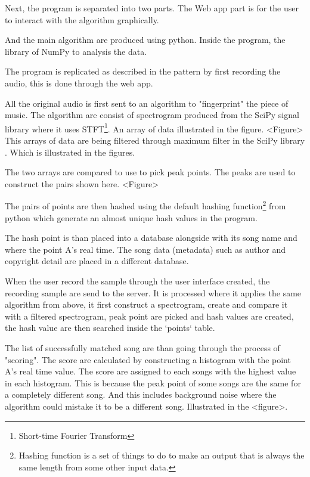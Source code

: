 Next, the program is separated into two parts. The Web app part is for the user to interact with the algorithm graphically. 

And the main algorithm are produced using python. Inside the program, the library of NumPy\cite{harris_array_2020} to analysis the data.

The program is replicated as described in the pattern by first recording the audio, this is done through the web app. 

All the original audio is first sent to an algorithm to "fingerprint" the piece of music. The algorithm are consist of spectrogram produced from the SciPy signal library where it uses STFT\footnote{Short-time Fourier Transform}.\cite{virtanen_scipy_2020} An array of data illustrated in the figure. <Figure> This arrays of data are being filtered through maximum filter in the SciPy library \cite{virtanen_scipy_2020}. Which is illustrated in the figures.

The two arrays are compared to use to pick peak points. The peaks are used to construct the pairs shown here. <Figure>

The pairs of points are then hashed using the default hashing function\footnote{Hashing function is a set of things to do to make an output that is always the same length from some other input data.\cite{noauthor_hash_2024}} from python which generate an almost unique hash values in the program.

The hash point is than placed into a database alongside with its song name and where the point A's real time. The song data (metadata) such as author and copyright detail are placed in a different database.

When the user record the sample through the user interface created, the recording sample are send to the server. It is processed where it applies the same algorithm from above, it first construct a spectrogram, create and compare it with a filtered spectrogram, peak point are picked and hash values are created, the hash value are then searched inside the `points` table. 

The list of successfully matched song are than going through the process of "scoring". The score are calculated by constructing a histogram with the point A's real time value. The score are assigned to each songs with the highest value in each histogram. This is because the peak point of some songs are the same for a completely different song. And this includes background noise where the algorithm could mistake it to be a different song. Illustrated in the <figure>.

